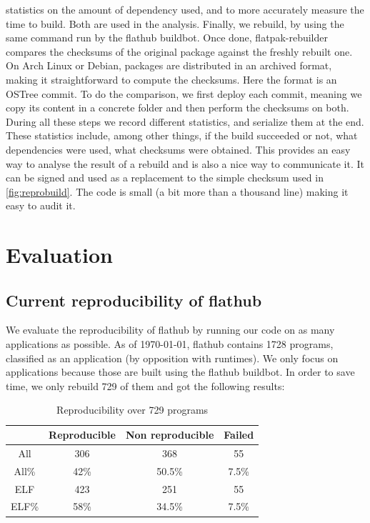 \documentclass[a4paper,11pt,oneside]{report}
\theoremstyle{definition}
\newcommand{\sysname}{flatpak-rebuilder\xspace}
\newcommand{\fh}{flathub\xspace}
\newcommand{\fhbb}{flathub buildbot\xspace}
\begin{document}
statistics on the amount of dependency used, and to more accurately measure the
time to build. Both are used in the analysis. Finally, we rebuild, by using the
same command run by the \fhbb. Once done, \sysname compares the checksums of
the original package against the freshly rebuilt one. On Arch Linux or Debian,
packages are distributed in an archived format, making it straightforward to
compute the checksums. Here the format is an OSTree commit. To do the
comparison, we first deploy each commit, meaning we copy its content in a
concrete folder and then perform the checksums on both. During all these steps
we record different statistics, and serialize them at the end. These statistics
include, among other things, if the build succeeded or not, what dependencies
were used, what checksums were obtained. This provides an easy way to analyse
the result of a rebuild and is also a nice way to communicate it. It can be
signed and used as a replacement to the simple checksum used in
\autoref{fig:reprobuild}. The code is small (a bit more than a thousand line)
making it easy to audit it.

\chapter{Evaluation}
\label{chap:eval}

\section{Current reproducibility of \fh}
\label{sec:cr}
We evaluate the reproducibility of \fh by running our code on as many
applications as possible. As of \today, \fh contains 1728 programs, classified
as an application (by opposition with runtimes). We only focus on applications
because those are built using the \fhbb. In order to save time, we only rebuild
729 of them and got the following results:

\begin{table}[h]
    \centering
        \begin{tabular}{|c|c|c|c|}
            \hline
            & Reproducible & Non reproducible & Failed\\
            \hline
            All & 306 & 368 & 55\\
            \hline
            All\% & 42\% & 50.5\% & 7.5\% \\
            \hline
            ELF & 423 & 251 & 55\\
            \hline
            ELF\% & 58\% & 34.5\% & 7.5\% \\
            \hline
        \end{tabular}
    \caption{Reproducibility over 729 programs}
    \label{tab:rebuild-all}
\end{table}
\end{document}
